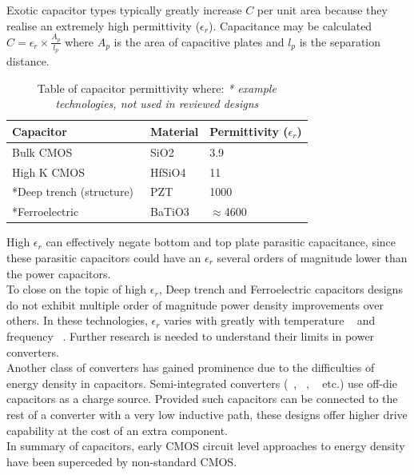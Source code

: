 \documentclass[letterpaper,twocolumn,10pt]{article}
\begin{document}
Exotic capacitor types typically greatly increase $C$ per unit area because they realise an extremely high permittivity ($\epsilon_r$). Capacitance may be calculated $C = \epsilon_r \times \frac{A_p}{l_p}$ where $A_p$ is the area of capacitive plates and $l_p$ is the separation distance. 
\begin{table}
    \begin{tabular}{|l|l|l|}
    \hline
    Capacitor               & Material & Permittivity ($\epsilon_r$) \\ \hline
    Bulk CMOS~\cite{Robertson2004}               & SiO2     & 3.9          \\ \hline
    High K CMOS~\cite{Robertson2004}             & HfSiO4   & 11           \\ \hline
    *Deep trench (structure)~\cite{Johari2009} & PZT      & 1000         \\ \hline
    *Ferroelectric~\cite{Lee2004}			& BaTiO3      & $\approx$4600         \\ \hline    
    \end{tabular}
    \caption{Table of capacitor permittivity where: \textit{* example technologies, not used in reviewed designs}}
    \label{PermittivityTable}
\end{table}
High $\epsilon_r$ can effectively negate bottom and top plate parasitic capacitance, since these parasitic capacitors could have an $\epsilon_r$ several orders of magnitude lower than the power capacitors.\\ 
To close on the topic of high $\epsilon_r$, Deep trench and Ferroelectric capacitors designs do not exhibit multiple order of magnitude power density improvements over others. In these technologies, $\epsilon_r$ varies with greatly with temperature ~\cite{Lee2004} and frequency ~\cite{Callister2012}. %
Further research is needed to understand their limits in power converters.\\
Another class of converters has gained prominence due to the difficulties of energy density in capacitors. Semi-integrated converters (~\cite{Pilawa2012}, ~\cite{Bathily2012}, ~\cite{Ng2012} etc.) use off-die capacitors as a charge source. Provided such capacitors can be connected to the rest of a converter with a very low inductive path, these designs offer higher drive capability at the cost of an extra component.\\
\indent In summary of capacitors, early CMOS circuit level approaches to energy density have been superceded by non-standard CMOS. %
\end{document}
